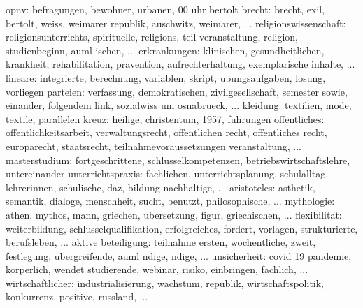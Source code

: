 

				 opnv: befragungen, bewohner, urbanen, 00 uhr
	   bertolt brecht: brecht, exil, bertolt, weiss, weimarer republik, auschwitz, weimarer, ...
religionswissenschaft: religionsunterrichts, spirituelle, religions, teil veranstaltung, religion, studienbeginn, auml ischen, ...
         erkrankungen: klinischen, gesundheitlichen, krankheit, rehabilitation, pravention, aufrechterhaltung, exemplarische inhalte, ...
	  		  lineare: integrierte, berechnung, variablen, skript, ubungsaufgaben, losung, vorliegen
	 		 parteien: verfassung, demokratischen, zivilgesellschaft, semester sowie, einander, folgendem link, sozialwiss uni osnabrueck, ...
	 		 kleidung: textilien, mode, textile, parallelen
			    kreuz: heilige, christentum, 1957, fuhrungen
 		 offentliches: offentlichkeitsarbeit, verwaltungsrecht, offentlichen recht, offentliches recht, europarecht, staatsrecht, teilnahmevoraussetzungen veranstaltung, ...
	    masterstudium: fortgeschrittene, schlusselkompetenzen, betriebswirtschaftslehre, untereinander
	unterrichtspraxis: fachlichen, unterrichtsplanung, schulalltag, lehrerinnen, schulische, daz, bildung nachhaltige, ...
  		  aristoteles: asthetik, semantik, dialoge, menschheit, sucht, benutzt, philosophische, ...
   		   mythologie: athen, mythos, mann, griechen, ubersetzung, figur, griechischen, ...
 		 flexibilitat: weiterbildung, schlusselqualifikation, erfolgreiches, fordert, vorlagen, strukturierte, berufsleben, ...
   aktive beteiligung: teilnahme ersten, wochentliche, zweit, festlegung, ubergreifende, auml ndige, ndige, ...
 		 unsicherheit: covid 19 pandemie, korperlich, wendet studierende, webinar, risiko, einbringen, fachlich, ...
	 wirtschaftlicher: industrialisierung, wachstum, republik, wirtschaftspolitik, konkurrenz, positive, russland, ...
